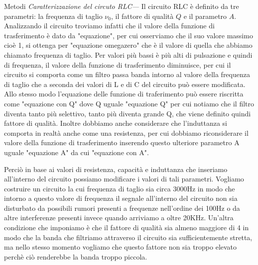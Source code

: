 \documentclass[
    rmp,
    reprint, 
    superscriptaddress, 
    altaffilletter, 
    amsmath, 
    amssymb, 
    a4paper]{revtex4-2}
\begin{document}
\begin{methods}{Metodi}
    \textit{Caratterizzazione del circuto RLC---} Il circuito RLC è definito da tre parametri: la frequenza di taglio $\nu_0$, il fattore di qualità $Q$ e il parametro $A$. Analizzando il circuito troviamo infatti che il valore della funzione di trasferimento è dato da "equazione", per cui osserviamo che il suo valore massimo cioè 1, si ottenga per "equazione omegazero" che è il valore di quella che abbiamo chiamato frequenza di taglio. Per valori più bassi è più alti di pulsazione e quindi di frequenza, il valore della funzione di trasferimento diminuisce, per cui il circuito si comporta come un filtro passa banda intorno al valore della frequenza di taglio che a seconda dei valori di L e di C del circuito può essere modificata. Allo stesso modo l'equazione delle funzione di traferimento può essere riscritta come "equazione con Q" dove Q uguale "equazione Q" per cui notiamo che il filtro diventa tanto più selettivo, tanto più diventa grande Q, che viene definito quindi fattore di qualità. Inoltre dobbiamo anche considerare che l'induttanza si comporta in realtà anche come una resistenza, per cui dobbiamo riconsiderare il valore della funzione di trasferimento inserendo questo ulteriore parametro A uguale "equazione A" da cui "equazione con A". 
    
    Perciò in base ai valori di resistenza, capacità e induttanza che inseriamo all'interno del circuito possiamo modificare i valori di tali parametri. Vogliamo costruire un circuito la cui frequenza di taglio sia circa 3000Hz in modo che intorno a questo valore di frequenza il segnale all'interno del circuito non sia disturbato da possibili rumori presenti a frequenze nell'ordine dei 100Hz o da altre interferenze presenti invece quando arriviamo a oltre 20KHz. Un'altra condizione che imponiamo è che il fattore di qualità sia almeno maggiore di 4 in modo che la banda che filtriamo attraverso il circuito sia sufficientemente stretta, ma nello stesso momento vogliamo che questo fattore non sia troppo elevato perchè ciò renderebbe la banda troppo piccola.
    

\end{methods}
\end{document}
